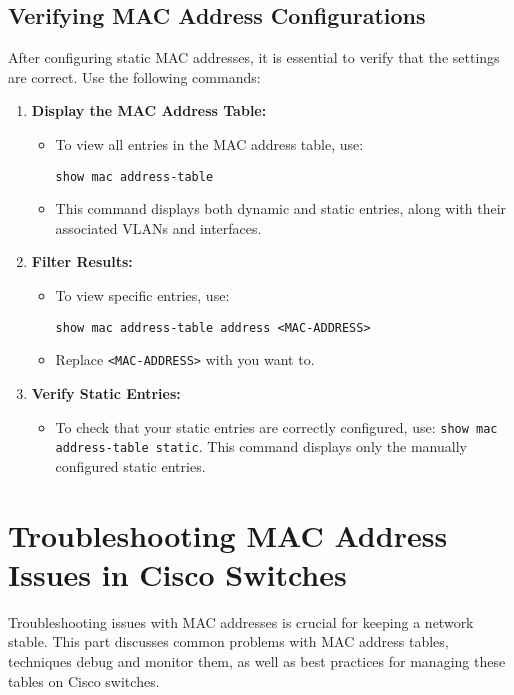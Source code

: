 \documentclass[11pt,a4paper]{article}
\begin{document}
\subsection*{Verifying MAC Address Configurations}
After configuring static MAC addresses, it is essential to verify that the settings are correct. Use the following commands:

\begin{enumerate}
    \item \textbf{Display the MAC Address Table:}
        \begin{itemize}
            \item To view all entries in the MAC address table, use:
\begin{lstlisting}
show mac address-table
\end{lstlisting}
            \item This command displays both dynamic and static entries, along with their associated VLANs and interfaces.
        \end{itemize}
        
    \item \textbf{Filter Results:}
        \begin{itemize}
            \item To view specific entries, use:
\begin{lstlisting}
show mac address-table address <MAC-ADDRESS>
\end{lstlisting}
            \item Replace \lstinline{<MAC-ADDRESS>} with you want to.
        \end{itemize}

    \item \textbf{Verify Static Entries:}
        \begin{itemize}
            \item To check that your static entries are correctly configured, use: \lstinline{show mac address-table static}. This command displays only the manually configured static entries.            
        \end{itemize}
\end{enumerate}


\section*{Troubleshooting MAC Address Issues in Cisco Switches}

Troubleshooting issues with MAC addresses is crucial for keeping a network stable. This part discusses common problems with MAC address tables, techniques  debug and monitor them, as well as best practices for managing these tables on Cisco switches.~\cite{Troubleshooting-Mac-Address-Table}
\end{document}
